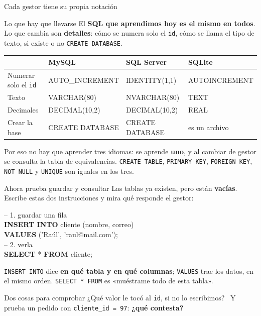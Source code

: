 \documentclass[aspectratio=169,10pt,c]{beamer}
\newcommand{\kw}[1]{\textcolor{utpRojo}{\textbf{#1}}}
\newcommand{\ins}[1]{\tikz[baseline=-0.5ex]{\node[rounded corners=2pt,fill=utpRojo,text=white,
  font=\bfseries\scriptsize,inner xsep=5pt,inner ysep=2.5pt] {#1};}}
\newenvironment{sqlcode}[1][.86\textwidth]
  {\begin{center}\begin{lrbox}{\sqlbuf}\begin{minipage}{#1}\ttfamily\footnotesize\vspace{6pt}\raggedright}
  {\vspace{6pt}\end{minipage}\end{lrbox}\colorbox{utpGrisClaro}{\usebox{\sqlbuf}}\end{center}}
\begin{document}
\begin{frame}{Cada gestor tiene su propia notación}
\begin{block}{Lo que hay que llevarse}
El \textbf{SQL que aprendimos hoy es el mismo en todos}. Lo que cambia son \textbf{detalles}: cómo se numera solo el \texttt{id}, cómo se llama el tipo de texto, si existe o no \texttt{CREATE DATABASE}.
\end{block}
\vspace{0.4cm}
\begin{center}
\small
\begin{tabular}{>{\raggedright\arraybackslash}p{3.1cm}>{\ttfamily}p{3.0cm}>{\ttfamily}p{2.9cm}>{\ttfamily}p{2.4cm}}
\toprule
& \normalfont\bfseries MySQL & \normalfont\bfseries SQL Server & \normalfont\bfseries SQLite \\
\midrule
Numerar solo el \texttt{id} & AUTO\_INCREMENT & IDENTITY(1,1) & AUTOINCREMENT \\[4pt]
Texto & VARCHAR(80) & NVARCHAR(80) & TEXT \\[4pt]
Decimales & DECIMAL(10,2) & DECIMAL(10,2) & REAL \\[4pt]
Crear la base & CREATE DATABASE & CREATE DATABASE & \normalfont es un archivo \\
\bottomrule
\end{tabular}
\end{center}
\vspace{0.4cm}
\small Por eso no hay que aprender tres idiomas: se aprende \textbf{uno}, y al cambiar de gestor se consulta la tabla de equivalencias. \texttt{CREATE TABLE}, \texttt{PRIMARY KEY}, \texttt{FOREIGN KEY}, \texttt{NOT NULL} y \texttt{UNIQUE} son iguales en los tres.
\end{frame}

\begin{frame}{\ins{Práctica 5} Ahora prueba guardar y consultar}
\small Las tablas ya existen, pero están \textbf{vacías}. Escribe estas dos instrucciones y mira qué responde el gestor:
\vspace{0.3cm}
\begin{sqlcode}[.80\textwidth]
\textcolor{utpGris}{-- 1. guardar una fila}\\
\kw{INSERT INTO} cliente (nombre, correo)\\
\kw{VALUES} ('Raúl', 'raul@mail.com');\\[9pt]
\textcolor{utpGris}{-- 2. verla}\\
\kw{SELECT} * \kw{FROM} cliente;
\end{sqlcode}
\vspace{0.15cm}
\small \texttt{INSERT INTO} dice \textbf{en qué tabla y en qué columnas}; \texttt{VALUES} trae los datos, en el mismo orden. \texttt{SELECT * FROM} es «muéstrame todo de esta tabla».
\vspace{0.3cm}
\begin{block}{Dos cosas para comprobar}
\small ¿Qué valor le tocó al \texttt{id}, si no lo escribimos? \ Y prueba un pedido con \texttt{cliente\_id = 97}: \textbf{¿qué contesta?}
\end{block}
\end{frame}
\end{document}
